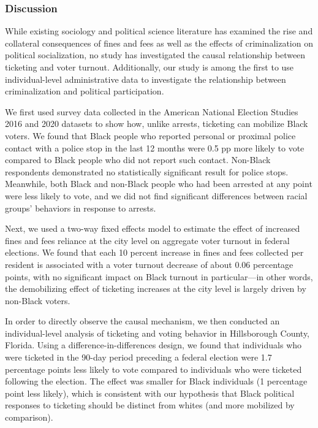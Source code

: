 \documentclass[
  12pt,
]{article}
\begin{document}
\hypertarget{discussion}{%
\subsubsection*{Discussion}\label{discussion}}

While existing sociology and political science literature has examined the rise and collateral consequences of fines and fees as well as the effects of criminalization on political socialization, no study has investigated the causal relationship between ticketing and voter turnout. Additionally, our study is among the first to use individual-level administrative data to investigate the relationship between criminalization and political participation.

We first used survey data collected in the American National Election Studies 2016 and 2020 datasets to show how, unlike arrests, ticketing can mobilize Black voters. We found that Black people who reported personal or proximal police contact with a police stop in the last 12 months were 0.5 pp more likely to vote compared to Black people who did not report such contact. Non-Black respondents demonstrated no statistically significant result for police stops. Meanwhile, both Black and non-Black people who had been arrested at any point were less likely to vote, and we did not find significant differences between racial groups' behaviors in response to arrests.

Next, we used a two-way fixed effects model to estimate the effect of increased fines and fees reliance at the city level on aggregate voter turnout in federal elections. We found that each 10 percent increase in fines and fees collected per resident is associated with a voter turnout decrease of about 0.06 percentage points, with no significant impact on Black turnout in particular---in other words, the demobilizing effect of ticketing increases at the city level is largely driven by non-Black voters.

In order to directly observe the causal mechanism, we then conducted an individual-level analysis of ticketing and voting behavior in Hillsborough County, Florida. Using a difference-in-differences design, we found that individuals who were ticketed in the 90-day period preceding a federal election were 1.7 percentage points less likely to vote compared to individuals who were ticketed following the election. The effect was smaller for Black individuals (1 percentage point less likely), which is consistent with our hypothesis that Black political responses to ticketing should be distinct from whites (and more mobilized by comparison).
\end{document}
